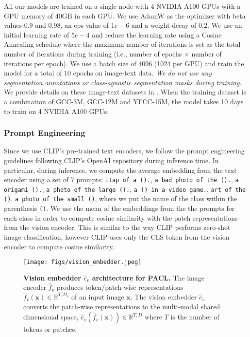 \documentclass[10pt,twocolumn,letterpaper]{article}
\begin{document}
All our models are trained on a single node with 4 NVIDIA A100 GPUs with a GPU memory of 40GB in each GPU. We use AdamW as the optimizer with beta values $0.9$ and $0.98$, an eps value of $1e-6$ and a weight decay of $0.2$. We use an initial learning rate of $5e-4$ and reduce the learning rate using a Cosine Annealing schedule where the maximum number of iterations is set as the total number of iterations during training (i.e., number of epochs $\times$ number of iterations per epoch). We use a batch size of 4096 (1024 per GPU) and train the model for a total of $10$ epochs on image-text data. \emph{We do not use any segmentation annotations or class-agnostic segmentation masks during training}. We provide details on these image-text datasets in . When the training dataset is a combination of GCC-3M, GCC-12M and YFCC-15M, the model takes 10 days to train on 4 NVIDIA A100 GPUs.

\subsubsection{Prompt Engineering}
\label{app:prompt_engg}

Since we use CLIP's \cite{radford2021learning} pre-trained text encoders, we follow the prompt engineering guidelines following CLIP's OpenAI repository during inference time. In particular, during inference, we compute the average embedding from the text encoder using a set of 7 prompts: \texttt{itap of a ().}, \texttt{a bad photo of the ().}, \texttt{a origami ().}, \texttt{a photo of the large ().}, \texttt{a () in a video game.}, \texttt{art of the ()}, \texttt{a photo of the small ()}, where we put the name of the class within the parenthesis \texttt{()}. We use the mean of the embeddings from the the prompts for each class in order to compute cosine similarity with the patch representations from the vision encoder. This is similar to the way CLIP performs zero-shot image classification, however CLIP uses only the CLS token from the vision encoder to compute cosine similarity.

\begin{figure}[!t]
\centering
    \texttt{[image: figs/vision\_embedder.jpeg]}
    \caption{\textbf{Vision embedder $\hat{e}_v$ architecture for PACL.} The image encoder $\hat{f}_v$ produces token/patch-wise representations $\hat{f}_v(\mathbf{x}) \in \mathbb{R}^{T, D_v}$ of an input image $\mathbf{x}$. The vision embedder $\hat{e}_v$ converts the patch-wise representations to the multi-modal shared dimensional space, $\hat{e}_v(\hat{f}_v(\mathbf{x})) \in \mathbb{R}^{T, D}$ where $T$ is the number of tokens or patches.}
    \vspace{-4mm}
    \label{fig:pacl_vision_embedder}
\end{figure}
\end{document}
